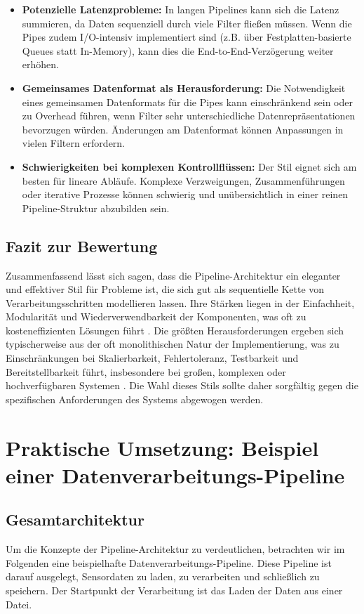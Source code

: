 \documentclass[11pt, a4paper]{article}
\begin{document}
\begin{itemize}
    \item \textbf{Potenzielle Latenzprobleme:} In langen Pipelines kann sich die Latenz summieren, da Daten sequenziell durch viele Filter fließen müssen. Wenn die Pipes zudem I/O-intensiv implementiert sind (z.B. über Festplatten-basierte Queues statt In-Memory), kann dies die End-to-End-Verzögerung weiter erhöhen.
    \item \textbf{Gemeinsames Datenformat als Herausforderung:} Die Notwendigkeit eines gemeinsamen Datenformats für die Pipes kann einschränkend sein oder zu Overhead führen, wenn Filter sehr unterschiedliche Datenrepräsentationen bevorzugen würden. Änderungen am Datenformat können Anpassungen in vielen Filtern erfordern.
    \item \textbf{Schwierigkeiten bei komplexen Kontrollflüssen:} Der Stil eignet sich am besten für lineare Abläufe. Komplexe Verzweigungen, Zusammenführungen oder iterative Prozesse können schwierig und unübersichtlich in einer reinen Pipeline-Struktur abzubilden sein.
\end{itemize}

\subsection{Fazit zur Bewertung}

Zusammenfassend lässt sich sagen, dass die Pipeline-Architektur ein eleganter und effektiver Stil für Probleme ist, die sich gut als sequentielle Kette von Verarbeitungsschritten modellieren lassen. Ihre Stärken liegen in der Einfachheit, Modularität und Wiederverwendbarkeit der Komponenten, was oft zu kosteneffizienten Lösungen führt \cite{RichardsFord2020}. Die größten Herausforderungen ergeben sich typischerweise aus der oft monolithischen Natur der Implementierung, was zu Einschränkungen bei Skalierbarkeit, Fehlertoleranz, Testbarkeit und Bereitstellbarkeit führt, insbesondere bei großen, komplexen oder hochverfügbaren Systemen \cite{RichardsFord2020}. Die Wahl dieses Stils sollte daher sorgfältig gegen die spezifischen Anforderungen des Systems abgewogen werden.

\section{Praktische Umsetzung: Beispiel einer Datenverarbeitungs-Pipeline}
\subsection{Gesamtarchitektur}
Um die Konzepte der Pipeline-Architektur zu verdeutlichen, betrachten wir im Folgenden eine beispielhafte Datenverarbeitungs-Pipeline. Diese Pipeline ist darauf ausgelegt, Sensordaten zu laden, zu verarbeiten und schließlich zu speichern. Der Startpunkt der Verarbeitung ist das Laden der Daten aus einer Datei.
\end{document}
